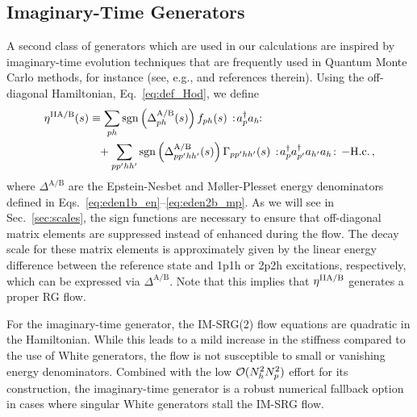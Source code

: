 \subsection{\label{sec:generators_ImTime}Imaginary-Time Generators}
A second class of generators which are used in our calculations are inspired by imaginary-time evolution techniques that are frequently used in Quantum Monte Carlo methods, for instance (see, e.g., \cite{Carlson:2015lq} and references therein). Using the off-diagonal Hamiltonian, Eq.~\eqref{eq:def_Hod}, we define
\begin{align}
  \etaO^\text{IIA/B}(s)
  &\equiv\sum_{ph} \sgn\!\left(\Delta^\text{A/B}_{ph}(s)\right)f_{ph}(s)\nord{\aaO_{p}\aO_{h}\!}\notag\\
  &\hphantom{=}
   +\sum_{pp'hh'}\sgn\!\left(\Delta^\text{A/B}_{pp'hh'}(s)\right)\Gamma_{pp'hh'}(s)\nord{\aaO_{p}\aaO_{p'}\aO_{h'}\aO_{h}}-\text{H.c.}\,,\label{eq:eta_imtime}
\end{align}
where $\Delta^\text{A/B}$ are the Epstein-Nesbet and M{\o}ller-Plesset energy denominators defined in Eqs.~\eqref{eq:eden1b_en}--\eqref{eq:eden2b_mp}. As we will see in Sec.~\ref{sec:scales}, the sign functions are necessary to ensure that off-diagonal matrix elements are suppressed instead of enhanced during the flow. The decay scale for these matrix elements is approximately given by the linear energy difference between the reference state and 1p1h or 2p2h excitations, respectively, which can be expressed via $\Delta^\text{A/B}$. Note that this implies that $\eta^\text{IIA/B}$ generates a proper RG flow.

For the imaginary-time generator, the IM-SRG(2) flow equations are quadratic in the Hamiltonian. While this leads to a mild increase in the stiffness compared to the use of White generators, the flow is not susceptible to small or vanishing energy denominators. Combined with the low $\mathcal{O}(N_h^2N_p^2)$ effort for its construction, the imaginary-time generator is a robust numerical fallback option in cases where singular White generators stall the IM-SRG flow.


